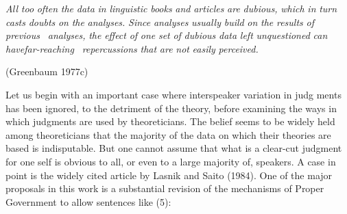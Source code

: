 \begin{styleStandard}
\textit{All}\textit{ }\textit{too}\textit{ }\textit{often}\textit{ }\textit{the}\textit{ }\textit{data}\textit{ }\textit{in}\textit{ }\textit{linguistic}\textit{ }\textit{books}\textit{ }\textit{and}\textit{ }\textit{articles}\textit{ }\textit{are}\textit{ }\textit{dubious,}\textit{ }\textit{which}\textit{ }\textit{in}\textit{ }\textit{turn}\textit{ }\textit{casts}\textit{ }\textit{doubts}\textit{ }\textit{on}\textit{ }\textit{the}\textit{ }\textit{analyses.}\textit{ }\textit{Since}\textit{ }\textit{analyses}\textit{ }\textit{usually}\textit{ }\textit{build}\textit{ }\textit{on}\textit{ }\textit{the}\textit{ }\textit{results}\textit{ }\textit{of}\textit{ }\textit{previous }\textit{\ }\textit{analyses,}\textit{ }\textit{the}\textit{ }\textit{effect}\textit{ }\textit{of}\textit{ }\textit{one}\textit{ }\textit{set}\textit{ }\textit{of}\textit{ }\textit{dubious}\textit{ }\textit{data}\textit{ }\textit{left}\textit{ }\textit{unquestioned}\textit{ }\textit{can}\textit{ }\textit{have}\textit{far-reaching}\textit{ }\textit{\ }\textit{repercussions}\textit{ }\textit{that}\textit{ }\textit{are}\textit{ }\textit{not}\textit{ }\textit{easily}\textit{ }\textit{perceived.}
\end{styleStandard}


\begin{styleStandard}
(Greenbaum 1977c)
\end{styleStandard}


\begin{styleStandard}
Let us begin with an important case where interspeaker variation in judg\- ments has been ignored, to the detriment of the theory, before examining the ways in which judgments are used by theoreticians. The belief seems to be widely held among theoreticians that the majority of the data on which their theories are based is indisputable. But one cannot assume that what is a clear-cut judgment for one\- self is obvious to all, or even to a large majority of, speakers. A case in point is the widely cited article by Lasnik and Saito (1984). One of the major proposals in this work is a substantial revision of the mechanisms of Proper Government to allow sentences like (5):
\end{styleStandard}


